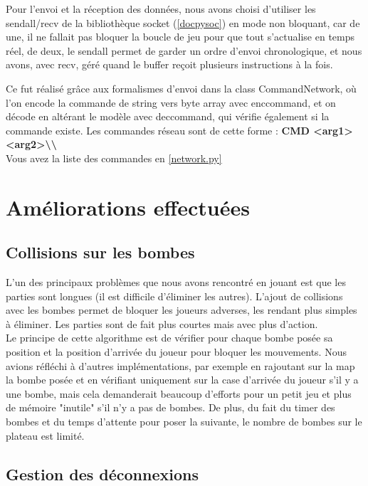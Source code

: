 \documentclass[a4paper]{article}
\begin{document}
		Pour l'envoi et la réception des données, nous avons choisi d'utiliser les sendall/recv de la bibliothèque socket (\ref{docpysoc}) en mode non bloquant, car de une, il ne fallait pas bloquer la boucle de jeu pour que tout s'actualise en temps réel, de deux, le sendall permet de garder un ordre d'envoi chronologique, et nous avons, avec recv, géré quand le buffer reçoit plusieurs instructions à la fois.

		Ce fut réalisé grâce aux formalismes d'envoi dans la class CommandNetwork, où l'on encode la commande de string vers byte array avec enc\textunderscore command, et on décode en altérant le modèle avec dec\textunderscore command, qui vérifie également si la commande existe. Les commandes réseau sont de cette forme :
		\textbf{CMD <arg1> <arg2>\textbackslash\textbackslash}
		\\

		Vous avez la liste des commandes en \ref{network.py}

	\section{Améliorations effectuées}
		\subsection{Collisions sur les bombes}
		L'un des principaux problèmes que nous avons rencontré en jouant est que les parties sont longues (il est difficile d'éliminer les autres).
		L'ajout de collisions avec les bombes permet de bloquer les joueurs adverses, les rendant plus simples à éliminer.
		Les parties sont de fait plus courtes mais avec plus d'action.
		\\

		Le principe de cette algorithme est de vérifier pour chaque bombe posée sa position et la position d'arrivée du joueur pour bloquer les mouvements. Nous avions réfléchi à d'autres implémentations, par exemple en rajoutant sur la map la bombe posée et en vérifiant uniquement sur la case d'arrivée du joueur s'il y a une bombe, mais cela demanderait beaucoup d'efforts pour un petit jeu et plus de mémoire "inutile" s'il n'y a pas de bombes. De plus, du fait du timer des bombes et du temps d'attente pour poser la suivante, le nombre de bombes sur le plateau est limité.

		

		\subsection{Gestion des déconnexions}
\end{document}
